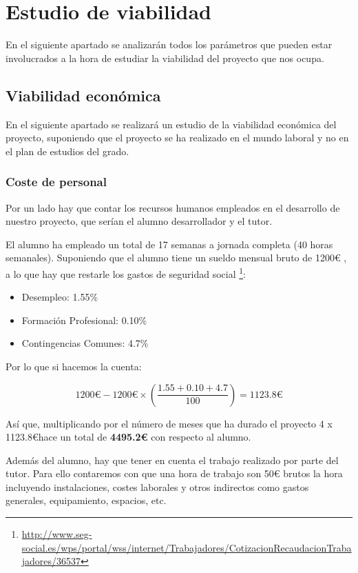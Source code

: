 \section{Estudio de viabilidad}

En el siguiente apartado se analizarán todos los parámetros que pueden estar involucrados a la hora de estudiar la viabilidad del proyecto que nos ocupa.

\subsection{Viabilidad económica}

En el siguiente apartado se realizará un estudio de la viabilidad económica del proyecto, suponiendo que el proyecto se ha realizado en el mundo laboral y no en el plan de estudios del grado.

\subsubsection{Coste de personal}
Por un lado hay que contar los recursos humanos empleados en el desarrollo de nuestro proyecto, que serían el alumno desarrollador y el tutor.

El alumno ha empleado un total de 17 semanas a jornada completa (40 horas semanales). Suponiendo que el alumno tiene un sueldo mensual bruto de 1200€ , a lo que hay que restarle los gastos de seguridad social \footnote{\url{http://www.seg-social.es/wps/portal/wss/internet/Trabajadores/CotizacionRecaudacionTrabajadores/36537}}:

\begin{itemize}
	\item Desempleo: 1.55\%
	\item Formación Profesional: 0.10\%
	\item Contingencias Comunes: 4.7\%
\end{itemize}

Por lo que si hacemos la cuenta:

\[1200\euro - 1200\euro \times \left (\frac{1.55 + 0.10 + 4.7}{100}\right ) = 1123.8\euro \]

Así que, multiplicando por el número de meses que ha durado el proyecto 4 x 1123.8\euro hace un total de \textbf{4495.2€} con respecto al alumno.

Además del alumno, hay que tener en cuenta el trabajo realizado por parte del tutor. Para ello contaremos con que una hora de trabajo son 50€ brutos la hora incluyendo instalaciones, costes laborales y otros indirectos como gastos generales, equipamiento, espacios, etc.

